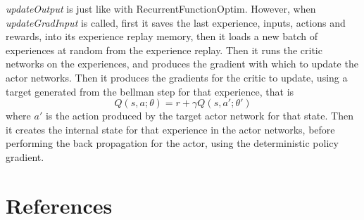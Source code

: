 \emph{updateOutput} is just like with RecurrentFunctionOptim. However, when \emph{updateGradInput} is called, first it saves the last experience, inputs, actions and rewards, into its experience replay memory, then it loads a new batch of experiences at random from the experience replay. Then it runs the critic networks on the experiences, and produces the gradient with which to update the actor networks. Then it produces the gradients for the critic to update, using a target generated from the bellman step for that experience, that is \begin{equation}
Q(s,a;\theta) = r + \gamma Q(s,a';\theta')
\end{equation} where $a'$ is the action produced by the target actor network for that state. Then it creates the internal state for that experience in the actor networks, before performing the back propagation for the actor, using the deterministic policy gradient.



\section{References}
\printbibliography[omitnumbers = false]